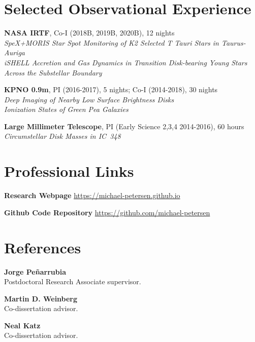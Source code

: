 \documentclass[margin, a4paper,11pt]{res} %
\begin{document}
\begin{resume}
\section{\sc \textcolor{redshade}{Selected Observational Experience}}

{\bf NASA IRTF}, Co-I (2018B, 2019B, 2020B), 12 nights\\
{\it SpeX+MORIS Star Spot Monitoring of K2 Selected T Tauri Stars in Taurus-Auriga}\\
{\it iSHELL Accretion and Gas Dynamics in Transition Disk-bearing Young Stars Across the Substellar Boundary}

{\bf KPNO 0.9m}, PI (2016-2017), 5 nights; Co-I (2014-2018), 30 nights\\
{\it Deep Imaging of Nearby Low Surface Brightness Disks}\\
{\it Ionization States of Green Pea Galaxies}

{\bf Large Millimeter Telescope}, PI (Early Science 2,3,4 2014-2016), 60 hours\\
{\it Circumstellar Disk Masses in IC~348}








\section{\sc \textcolor{redshade}{Professional Links}}
{\bf Research Webpage} \url{https://michael-petersen.github.io}

{\bf Github Code Repository} \url{https://github.com/michael-petersen}


\section{\sc \textcolor{redshade}{References}}

{\bf Jorge Pe{\~n}arrubia}\\
Postdoctoral Research Associate supervisor.

{\bf Martin D. Weinberg}\\
Co-dissertation advisor.

{\bf Neal Katz}\\
Co-dissertation advisor.

\end{resume}
\end{document}
